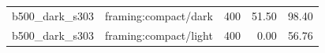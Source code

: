 \begin{longtable}{l>{\raggedright\arraybackslash}p{.42\linewidth}rrr}
b500\_\allowbreak{}dark\_\allowbreak{}s303 & %
framing:compact/dark & %
400 & %
51.50 & %
98.40 \\ %

b500\_\allowbreak{}dark\_\allowbreak{}s303 & %
framing:compact/light & %
400 & %
0.00 & %
56.76 \\ %


\end{longtable}
